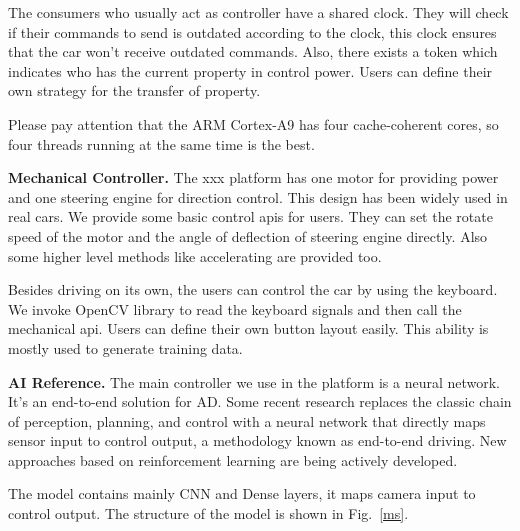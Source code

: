 \documentclass[conference]{IEEEtran}
\begin{document}
\begin{sloppypar}
The consumers who usually act as controller have a shared clock. They will check if their commands to send is outdated according to the clock, this clock ensures that the car won't receive outdated commands. Also, there exists a token which indicates who has the current property in control power. Users can define their own strategy for the transfer of property.

Please pay attention that the ARM Cortex-A9 has four cache-coherent cores, so four threads running at the same time is the best. 

\textbf{Mechanical Controller.} The xxx platform has one motor for providing power and one steering engine for direction control. This design has been widely used in real cars. We provide some basic control apis for users. They can set the rotate speed of the motor and the angle of deflection of steering engine directly. Also some higher level methods like accelerating are provided too. 

Besides driving on its own, the users can control the car by using the keyboard. We invoke OpenCV\cite{b20} library to read the keyboard signals and then call the mechanical api. Users can define their own button layout easily. This ability is mostly used to generate training data.

\textbf{AI Reference.} The main controller we use in the platform is a neural network. It's an end-to-end solution for AD. Some recent research replaces the classic chain of perception, planning, and control with a neural network that directly maps sensor input to control output\cite{b21, b22, b23}, a methodology known as end-to-end driving. New approaches based on reinforcement learning are being actively developed\cite{b24}.

The model contains mainly CNN and Dense layers\cite{b25}, it maps camera input to control output. The structure of the model is shown in Fig.~\ref{ms}.


\end{sloppypar}
\end{document}
